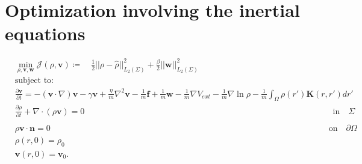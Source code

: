 \documentclass[11pt, a4paper]{article}
\theoremstyle{definition}
\newcommand{\Stav}{\mathbf{v}}
\newcommand{\Con}{\mathbf{f}}
\begin{document}
	\section*{Optimization involving the inertial equations}
	\begin{align*}
	&\min_{\rho,\Stav,\mathbf{w} } \mathcal J(\rho,\Stav) \coloneqq \quad \frac{1}{2}||\rho - \widehat \rho||_{L_2(\Sigma)}^2  +\frac{\beta}{2}||\mathbf{w}||_{L_2(\Sigma)}^2\\
	&\text{subject to:}\\
	& \frac{\partial \Stav}{\partial t}= -  (\Stav \cdot \nabla)\Stav - \gamma  \Stav + \frac{\eta}{m} \nabla^2 \Stav  -\frac{1}{m}\Con +\frac{1}{m}\mathbf{w} -\frac{1}{m} \nabla V_{ext} - \frac{1}{m}\nabla \ln \rho  -\frac{1}{m}\int_\Omega \rho(r') \mathbf{K}(r,r')dr' \\
	&\frac{\partial \rho}{\partial t} + \nabla \cdot (\rho \Stav)=0 \qquad\qquad \qquad\qquad\qquad\quad \quad\quad\qquad \qquad\qquad \qquad\qquad\qquad\quad \qquad\quad\ \ \text{in} \quad \Sigma\\
	\\
	&\rho \Stav \cdot \mathbf{n} =0\qquad\qquad \qquad\qquad\qquad\qquad\qquad\qquad\qquad \qquad\qquad \qquad\qquad\qquad \qquad\qquad\quad  \text{on} \quad \partial  \Omega\\
	& \rho(r,0)=\rho_0\\
	& \Stav(r,0)=\Stav_0.
	\end{align*}
	
\end{document}
